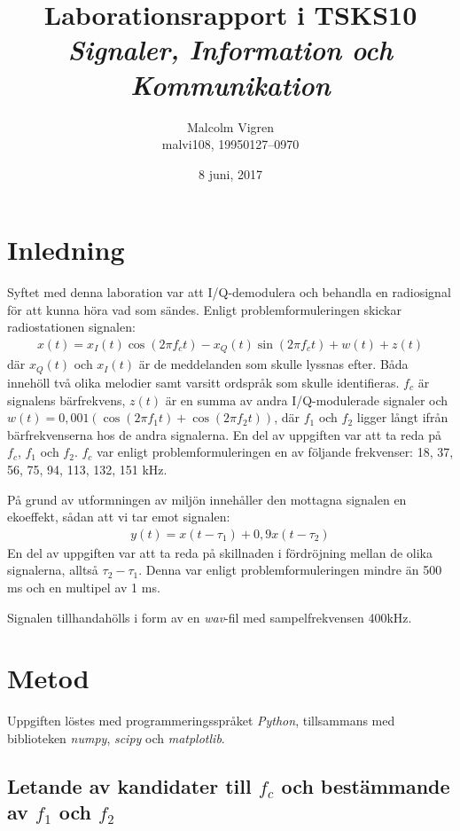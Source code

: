 \documentclass[10pt,twocolumn]{article}
\title{Laborationsrapport i TSKS10 \emph{Signaler, Information och Kommunikation}}
\author{Malcolm Vigren \\ malvi108, 19950127--0970 }
\date{8 juni, 2017}
\begin{document}
\maketitle

\section{Inledning}

Syftet med denna laboration var att I/Q-demodulera och behandla en radiosignal
för att kunna höra vad som sändes. Enligt problemformuleringen skickar
radiostationen signalen:
\begin{align*}
    x(t) = x_I(t)\cos(2 \pi f_c t) - x_Q(t)\sin(2 \pi f_c t) + w(t) + z(t)
\end{align*}
där $x_Q(t)$ och $x_I(t)$ är de meddelanden som skulle lyssnas efter. 
Båda innehöll två olika melodier samt varsitt ordspråk som skulle identifieras.
$f_c$ är signalens bärfrekvens, $z(t)$ är en summa av andra I/Q-modulerade
signaler och $w(t) = 0,001(\cos(2 \pi f_1 t) + \cos(2 \pi f_2 t))$, där $f_1$ och
$f_2$ ligger långt ifrån bärfrekvenserna hos de andra signalerna. En del av
uppgiften var att ta reda på $f_c$, $f_1$ och $f_2$. $f_c$ var enligt
problemformuleringen en av följande frekvenser: 18, 37, 56, 75, 94, 113,
132, 151 kHz.

På grund av utformningen av miljön innehåller den mottagna signalen en
ekoeffekt, sådan att vi tar emot signalen:
\begin{align*}
    y(t) = x(t - \tau_1) + 0,9x(t - \tau_2)
\end{align*}
En del av uppgiften var att ta reda på skillnaden i fördröjning mellan 
de olika signalerna,
alltså $\tau_2 - \tau_1$. Denna var enligt problemformuleringen mindre än 500 ms
och en multipel av 1 ms.

Signalen tillhandahölls i form av en \textit{wav}-fil med sampelfrekvensen 400kHz.

\section{Metod}

Uppgiften löstes med programmeringsspråket \textit{Python}, tillsammans med
biblioteken \textit{numpy}, \textit{scipy} och \textit{matplotlib}.

\subsection{Letande av kandidater till $f_c$ och bestämmande av $f_1$ och
$f_2$}\label{sub:candidates}
\end{document}
